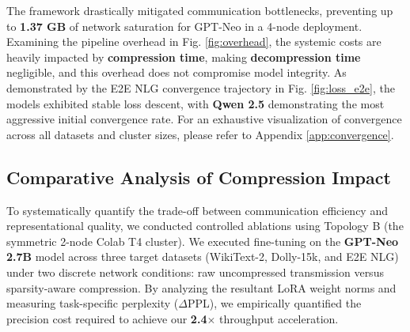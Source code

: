 \documentclass{ieeeaccess}
\begin{document}
The framework drastically mitigated communication bottlenecks, preventing up to \textbf{1.37 GB} of network saturation for GPT-Neo in a 4-node deployment. Examining the pipeline overhead in Fig. \ref{fig:overhead}, the systemic costs are heavily impacted by \textbf{compression time}, making \textbf{decompression time} negligible, and this overhead does not compromise model integrity. As demonstrated by the E2E NLG convergence trajectory in Fig. \ref{fig:loss_e2e}, the models exhibited stable loss descent, with \textbf{Qwen 2.5} demonstrating the most aggressive initial convergence rate. For an exhaustive visualization of convergence across all datasets and cluster sizes, please refer to Appendix \ref{app:convergence}.

\subsection{Comparative Analysis of Compression Impact}
To systematically quantify the trade-off between communication efficiency and representational quality, we conducted controlled ablations using Topology B (the symmetric 2-node Colab T4 cluster). We executed fine-tuning on the \textbf{GPT-Neo 2.7B} model across three target datasets (WikiText-2, Dolly-15k, and E2E NLG) under two discrete network conditions: raw uncompressed transmission versus sparsity-aware compression. By analyzing the resultant LoRA weight norms and measuring task-specific perplexity ($\Delta$PPL), we empirically quantified the precision cost required to achieve our \textbf{2.4$\times$} throughput acceleration.
\end{document}
